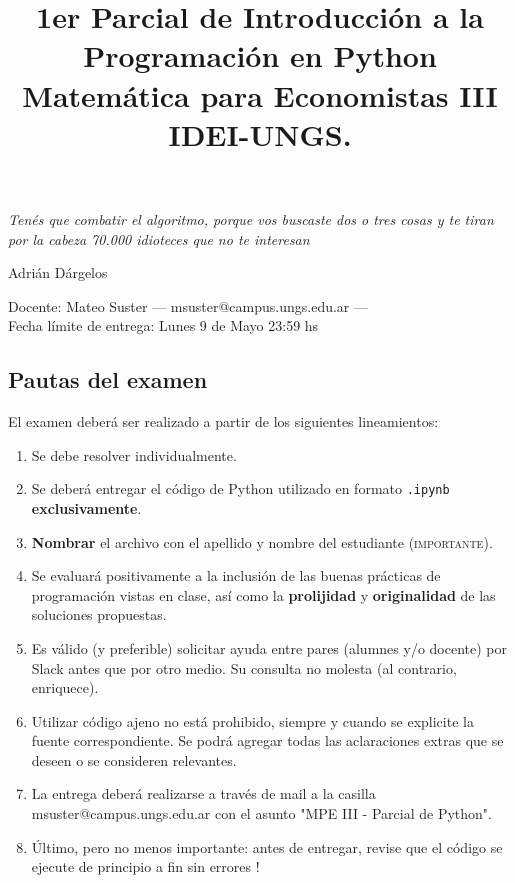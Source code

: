 \documentclass[a4paper,11pt]{article}
\title{1er Parcial de Introducción a la Programación en Python\\ Matemática para Economistas III \\ IDEI-UNGS.}
\begin{document}
\maketitle
\epigraph{\itshape Tenés que combatir el algoritmo, porque vos buscaste dos o tres cosas y te tiran por la cabeza 70.000 idioteces que no te interesan}{Adrián Dárgelos }	

\noindent Docente: Mateo Suster --- msuster@campus.ungs.edu.ar --- \\
Fecha límite de entrega: Lunes 9 de Mayo 23:59 hs


\subsection*{Pautas del examen}
El examen deberá ser realizado a partir de los siguientes lineamientos:
\begin{enumerate}
	\item Se debe resolver individualmente. 
	\item Se deberá entregar el código de Python utilizado en formato \texttt{.ipynb} \textbf{exclusivamente}.
	\item \textbf{Nombrar} el archivo con el apellido y nombre del estudiante (\textsc{importante}).
	\item Se evaluará positivamente a la inclusión de las buenas prácticas de programación vistas en clase, así como la \textbf{prolijidad} y \textbf{originalidad} de las soluciones propuestas.
	\item Es válido (y preferible) solicitar ayuda entre pares (alumnes y/o docente) por Slack antes que por otro medio. Su consulta no molesta (al contrario, enriquece).
	\item Utilizar código ajeno no está prohibido, siempre y cuando se explicite la fuente correspondiente. Se podrá agregar todas las aclaraciones extras que se deseen o se consideren relevantes.
	\item La entrega deberá realizarse a través de mail a la casilla msuster@campus.ungs.edu.ar con el asunto "MPE III - Parcial de Python".
	\item Último, pero no menos importante: antes de entregar, revise que el código se ejecute de principio a fin sin errores !
\end{enumerate}
\end{document}
